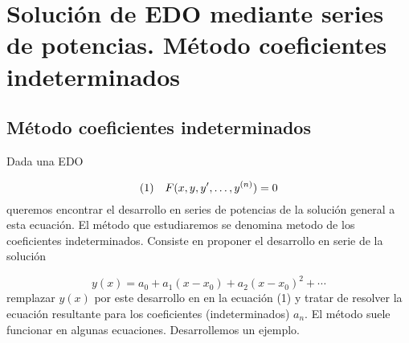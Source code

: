 \documentclass{article}
\newcounter{lem_cont}
\newcounter{ejem_cont}
\renewcommand{\emph}[1]{\textcolor[rgb]{0,0,1}{#1}}
\begin{document}
\section{Solución de EDO mediante series de potencias. Método coeficientes indeterminados}



\subsection{Método coeficientes indeterminados}

Dada una EDO

\begin{equation} \hbox{(1)}\quad  F(x,y,y',\ldots,y^{(n)})=0\end{equation}
queremos encontrar el desarrollo en series de potencias de la solución general a esta ecuación. El método que estudiaremos se denomina \emph{metodo de los coeficientes indeterminados}. Consiste en proponer el desarrollo en serie de la solución

\[y(x)=a_0+a_1(x-x_0)+a_2(x-x_0)^2+\cdots  \]
remplazar $y(x)$ por este desarrollo en  en la ecuación (1) y tratar de resolver la ecuación resultante para los coeficientes (indeterminados) $a_n$. El método suele funcionar en algunas ecuaciones. Desarrollemos un ejemplo.

 
\end{document}
